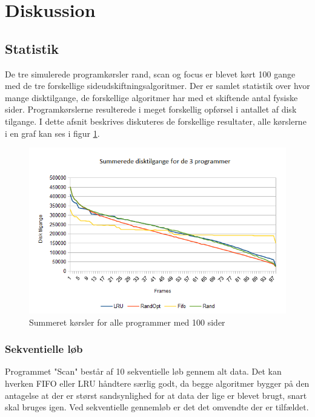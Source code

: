 \section{Diskussion}

\subsection{Statistik}
\label{subsec:statistik}
De tre simulerede programkørsler rand, scan og focus er blevet kørt 100 gange med de tre forskellige sideudskiftningsalgoritmer. Der er samlet statistik over hvor mange disktilgange, de forskellige algoritmer har med et skiftende antal fysiske sider. Programkørslerne resulterede i meget forskellig opførsel i antallet af disk tilgange. I dette afsnit beskrives diskuteres de forskellige resultater, alle kørslerne i en graf kan ses i figur \ref{fig:all}.

\begin{figure}[ht]
\centerline{\includegraphics[scale=1]{graph/stat_all}}
\FloatBarrier
\caption{Summeret kørsler for alle programmer med 100 sider}
\label{fig:all}
\end{figure}

\subsubsection{Sekventielle løb}
Programmet "Scan" består af 10 sekventielle løb gennem alt data. Det kan  hverken FIFO eller LRU håndtere særlig godt, da begge algoritmer bygger på den antagelse at der er størst sandsynlighed for at data der lige er blevet brugt, snart skal bruges igen. Ved sekventielle gennemløb er det det omvendte der er tilfældet. 

